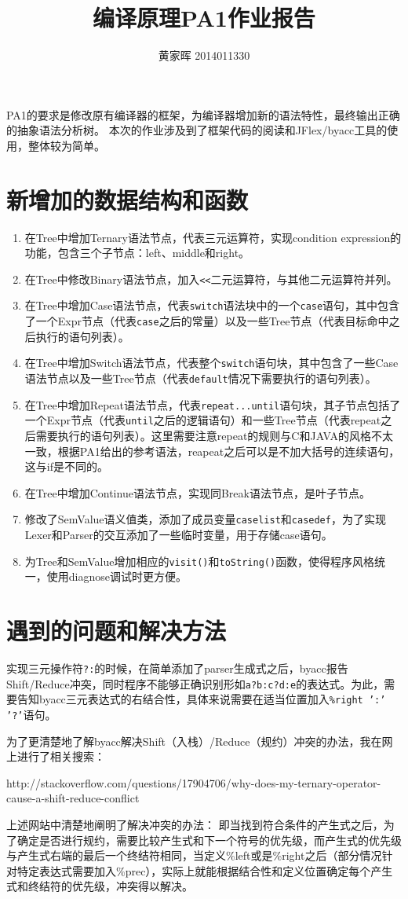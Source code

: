 \documentclass[12pt,a4paper]{article}
\title{编译原理PA1作业报告}
\author{黄家晖 2014011330}
\date{}
\begin{document}
\maketitle

PA1的要求是修改原有编译器的框架，为编译器增加新的语法特性，最终输出正确的抽象语法分析树。
本次的作业涉及到了框架代码的阅读和JFlex/byacc工具的使用，整体较为简单。

\section{新增加的数据结构和函数}
\begin{enumerate}
\item 在Tree中增加Ternary语法节点，代表三元运算符，实现condition expression的功能，包含三个子节点：left、middle和right。
\item 在Tree中修改Binary语法节点，加入\texttt{<<}二元运算符，与其他二元运算符并列。
\item 在Tree中增加Case语法节点，代表\texttt{switch}语法块中的一个\texttt{case}语句，其中包含了一个Expr节点（代表\texttt{case}之后的常量）以及一些Tree节点（代表目标命中之后执行的语句列表）。
\item 在Tree中增加Switch语法节点，代表整个\texttt{switch}语句块，其中包含了一些Case语法节点以及一些Tree节点（代表\texttt{default}情况下需要执行的语句列表）。
\item 在Tree中增加Repeat语法节点，代表\texttt{repeat...until}语句块，其子节点包括了一个Expr节点（代表\texttt{until}之后的逻辑语句）和一些Tree节点（代表repeat之后需要执行的语句列表）。这里需要注意repeat的规则与C和JAVA的风格不太一致，根据PA1给出的参考语法，reapeat之后可以是不加大括号的连续语句，这与if是不同的。
\item 在Tree中增加Continue语法节点，实现同Break语法节点，是叶子节点。
\item 修改了SemValue语义值类，添加了成员变量\texttt{caselist}和\texttt{casedef}，为了实现Lexer和Parser的交互添加了一些临时变量，用于存储case语句。
\item 为Tree和SemValue增加相应的\texttt{visit()}和\texttt{toString()}函数，使得程序风格统一，使用diagnose调试时更方便。
\end{enumerate}

\section{遇到的问题和解决方法}

实现三元操作符\texttt{?:}的时候，在简单添加了parser生成式之后，byacc报告Shift/Reduce冲突，同时程序不能够正确识别形如\texttt{a?b:c?d:e}的表达式。为此，需要告知byacc三元表达式的右结合性，具体来说需要在适当位置加入\texttt{\%right ':'  '?'}语句。

为了更清楚地了解byacc解决Shift（入栈）/Reduce（规约）冲突的办法，我在网上进行了相关搜索：

http://stackoverflow.com/questions/17904706/why-does-my-ternary-operator-cause-a-shift-reduce-conflict

上述网站中清楚地阐明了解决冲突的办法：
即当找到符合条件的产生式之后，为了确定是否进行规约，需要比较产生式和下一个符号的优先级，而产生式的优先级与产生式右端的最后一个终结符相同，当定义\%left或是\%right之后（部分情况针对特定表达式需要加入\%prec），实际上就能根据结合性和定义位置确定每个产生式和终结符的优先级，冲突得以解决。
\end{document}
